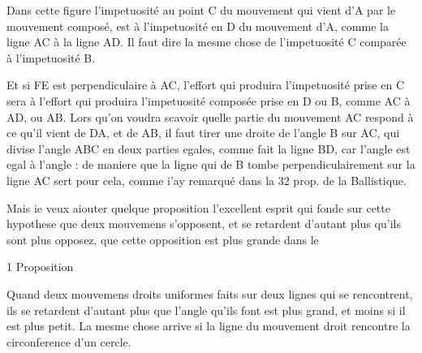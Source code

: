\documentclass[11pt,a4paper]{article}
\begin{document}
Dans cette figure l'impetuosité  au point C du mouvement qui vient d'A par le mouvement composé, est à l'impetuosité  en D du mouvement  \struck{\ill{}} d'A, comme la ligne AC à la ligne AD. Il faut dire la mesme chose de l'impetuosité C comparée à l'impetuosité B.

Et si FE est perpendiculaire à AC, l'effort qui produira l'impetuosité \struck{\ill{}}  prise en C sera à l'effort qui produira l'impetuosité composée prise en D ou B, comme AC à AD, ou AB. Lors qu'on voudra scavoir quelle partie \struck{\ill{}} du mouvement AC respond à ce qu'il vient de DA, et de AB, il faut \struck{\ill{}} tirer une droite de \struck{\ill{}} l'angle B sur AC, qui divise l'angle ABC en deux parties egales, comme fait la ligne BD, car l'angle   est egal à l'angle   : de \struck{\ill{}} maniere que la ligne qui de B tombe perpendiculairement sur la ligne AC  sert \struck{\ill{}} \add{\ill{}} pour cela, comme i'ay remarqué dans la 32 prop. de la Ballistique.

Mais ie veux aiouter quelque proposition   l'excellent esprit qui fonde sur cette hypothese que deux mouvemens s'opposent, et se retardent d'autant plus qu'ils sont plus opposez,  \struck{\ill{}} que cette opposition est plus grande dans le \struck{\ill{}}

1 Proposition

Quand \struck{\ill{}} deux mouvemens droits uniformes faits sur deux lignes qui se rencontrent, ils  se retardent d'autant plus que l'angle qu'ils font est plus grand, et moins si il est plus petit. La mesme chose arrive si   la ligne du mouvement droit rencontre la circonference d'un cercle.
\end{document}
